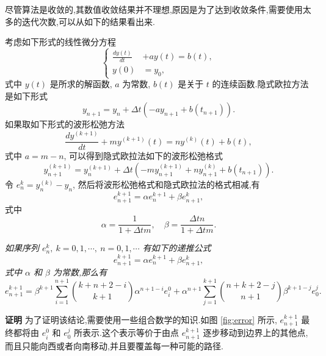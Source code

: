尽管算法是收敛的,其数值收敛结果并不理想,原因是为了达到收敛条件,需要使用太多的迭代次数,可以从如下的结果看出来.

考虑如下形式的线性微分方程
\begin{equation*}
  \left\{
    \begin{aligned}
      \frac{dy(t)}{dt}&+ay(t)=b(t),\\
      y(0)&=y_{0},
    \end{aligned}
  \right.
\end{equation*}
式中 $y(t)$ 是所求的解函数, $a$ 为常数, $b(t)$ 是关于 $t$ 的连续函数.隐式欧拉方法是如下形式
\begin{equation*}
  y_{n+1}=y_{n}+\Delta t (-a y_{n+1}+b(t_{n+1})).
\end{equation*}
如果取如下形式的波形松弛方法
\begin{equation*}
  \frac{dy^{(k+1)}}{dt}+m y^{(k+1)}(t) = n y^{(k)}(t) + b(t),
\end{equation*}
式中 $a=m-n$, 可以得到隐式欧拉法如下的波形松弛格式
\begin{equation*}
  y_{n+1}^{(k+1)}=y_{n}^{(k+1)}+\Delta t(-m y_{n+1}^{(k+1)}+n y_{n+1}^{(k)} +b(t_{n+1})).
\end{equation*}
令 $e_{n}^{k}=y_{n}^{(k)}-y_{n}$, 然后将波形松弛格式和隐式欧拉法的格式相减,有
\begin{equation*}
  e_{n+1}^{k+1}=\alpha e_{n}^{k+1} + \beta e_{n+1}^{k},
\end{equation*}
式中
\begin{equation*}
  \alpha = \frac{1}{1+\Delta t m}, \quad \beta = \frac{\Delta t n}{1+\Delta t m}.
\end{equation*}

\begin{lemma}\label{lem:error} \emph{如果序列
  $e_{n}^{k},~k =0,1,\cdots,~n=0,1,\cdots$ 有如下的递推公式
  \begin{equation*}
    e_{n+1}^{k+1}=\alpha e_{n}^{k+1} + \beta e_{n+1}^{k},
  \end{equation*}
  式中 $\alpha$ 和 $\beta$ 为常数,那么有
  \begin{equation*}
    e_{n+1}^{k+1}=\beta^{k+1} \sum_{i=1}^{n+1} \binom{k+n+2-i}{k+1} \alpha^{n+1-i}e_{i}^{0} + \alpha^{n+1} \sum_{j=1}^{k+1}\binom{n+k+2-j}{n+1} \beta^{k+1-j}e_{0}^{j}.
  \end{equation*}}
\end{lemma}

{\textbf{证明}} 为了证明该结论,需要使用一些组合数学的知识.如图 \ref{fig:error} 所示, $e_{n+1}^{k+1}$ 最终都将由 $e_{i}^{0}$ 和 $e_{0}^{j}$ 所表示.这个表示等价于由点 $e_{n+1}^{k+1}$ 逐步移动到边界上的其他点,而且只能向西或者向南移动,并且要覆盖每一种可能的路径.

